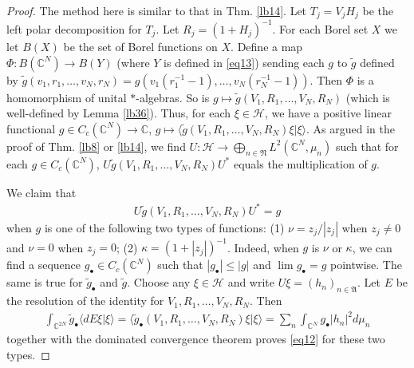 \documentclass[12pt,a4paper,notitlepage]{article}
\theoremstyle{definition}
\theoremstyle{plain}
\newcommand{\fk}{\mathfrak}
\newcommand{\mc}{\mathcal}
\newcommand{\wtd}{\widetilde}
\newcommand{\bk}[1]{\langle {#1}\rangle}
\newcommand{\blt}{\bullet}
\newcommand{\Cbb}{\mathbb C}
\numberwithin{equation}{section}
\begin{document}
\begin{proof}
The method here is similar to that in Thm. \ref{lb14}. Let $T_j=V_jH_j$ be the left polar decomposition for $T_j$. Let $R_j=(1+H_j)^{-1}$. For each Borel set $X$ we let $B(X)$ be the set of Borel functions on $X$. Define a map $\Phi:B(\Cbb^N)\rightarrow B(Y)$ (where $Y$ is defined in \eqref{eq13}) sending each $g$ to $\wtd g$ defined by $\wtd g(v_1,r_1,\dots,v_N,r_N)=g(v_1(r_1^{-1}-1),\dots,v_N(r_N^{-1}-1))$. Then $\Phi$ is a homomorphism of unital $*$-algebras. So is $g\mapsto \wtd g(V_1,R_1,\dots,V_N,R_N)$ (which is well-defined by Lemma \ref{lb36}). Thus, for each $\xi\in\mc H$, we have a positive linear functional $g\in C_c(\Cbb^N)\rightarrow\Cbb$, $g\mapsto \bk{\wtd g(V_1,R_1,\dots,V_N,R_N)\xi|\xi}$. As argued in the proof of Thm. \ref{lb8} or \ref{lb14}, we find $U:\mc H\rightarrow\bigoplus_{n\in\fk N}L^2(\Cbb^N,\mu_n)$ such that for each $g\in C_c(\Cbb^N)$,  $U\wtd g(V_1,R_1,\dots,V_N,R_N)U^*$ equals the multiplication of $g$. 

We claim that
\begin{align}
U\wtd g(V_1,R_1,\dots,V_N,R_N)U^*=g	\label{eq12}
\end{align}
when $g$ is one of the following two types of functions: (1) $\nu=z_j/|z_j|$ when $z_j\neq 0$ and $\nu=0$ when $z_j=0$; (2) $\kappa=(1+|z_j|)^{-1}$. Indeed, when $g$ is $\nu$ or $\kappa$, we can find a sequence $g_\blt\in C_c(\Cbb^N)$ such that $|g_\blt|\leq |g|$ and $\lim g_\blt=g$ pointwise. The same is true for $\wtd g_\blt$ and $\wtd g$. Choose any $\xi\in\mc H$ and write $U\xi=(h_n)_{n\in\fk A}$. Let $E$ be the resolution of the identity for $V_1,R_1,\dots,V_N,R_N$. Then
\begin{align*}
	\int_{\Cbb^{2N}} \wtd g_\blt\bk{dE\xi|\xi}=\bk{\wtd g_\blt(V_1,R_1,\dots,V_N,R_N)\xi|\xi}=\sum_n\int_{\Cbb^N}g_\blt|h_n|^2d\mu_n	
\end{align*} 
together with the dominated convergence theorem proves \eqref{eq12} for these two types.


\end{proof}
\end{document}
